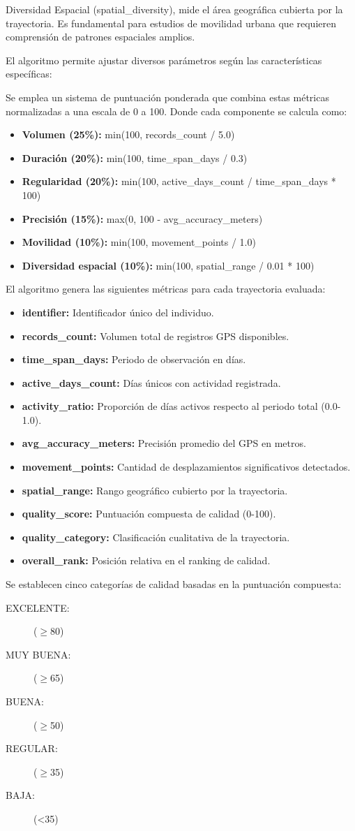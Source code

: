Diversidad Espacial (spatial\_diversity), mide el área geográfica cubierta por la trayectoria. Es fundamental para estudios de movilidad urbana que requieren comprensión de patrones espaciales amplios.

El algoritmo permite ajustar diversos parámetros según las características específicas:


Se emplea un sistema de puntuación ponderada que combina estas métricas normalizadas a una escala de 0 a 100. Donde cada componente se calcula como:

\begin{itemize}
    \item \textbf{Volumen (25\%):} min(100, records\_count / 5.0)
    \item \textbf{Duración (20\%):} min(100, time\_span\_days / 0.3)
    \item \textbf{Regularidad (20\%):} min(100, active\_days\_count / time\_span\_days * 100)
    \item \textbf{Precisión (15\%):} max(0, 100 - avg\_accuracy\_meters)
    \item \textbf{Movilidad (10\%):} min(100, movement\_points / 1.0)
    \item \textbf{Diversidad espacial (10\%):} min(100, spatial\_range / 0.01 * 100)
\end{itemize}

El algoritmo genera las siguientes métricas para cada trayectoria evaluada:

\begin{itemize}
    \item \textbf{identifier:} Identificador único del individuo.
    \item \textbf{records\_count:} Volumen total de registros GPS disponibles.
    \item \textbf{time\_span\_days:} Periodo de observación en días.
    \item \textbf{active\_days\_count:} Días únicos con actividad registrada.
    \item \textbf{activity\_ratio:} Proporción de días activos respecto al periodo total (0.0-1.0).
    \item \textbf{avg\_accuracy\_meters:} Precisión promedio del GPS en metros.
    \item \textbf{movement\_points:} Cantidad de desplazamientos significativos detectados.
    \item \textbf{spatial\_range:} Rango geográfico cubierto por la trayectoria.
    \item \textbf{quality\_score:} Puntuación compuesta de calidad (0-100).
    \item \textbf{quality\_category:} Clasificación cualitativa de la trayectoria.
    \item \textbf{overall\_rank:} Posición relativa en el ranking de calidad.
\end{itemize}

Se establecen cinco categorías de calidad basadas en la puntuación compuesta:

\begin{description}
    \item[EXCELENTE:] ($\geq$80)
    \item[MUY BUENA:] ($\geq$65)
    \item[BUENA:] ($\geq$50)
    \item[REGULAR:] ($\geq$35)
    \item[BAJA:] (<35)     
\end{description}


